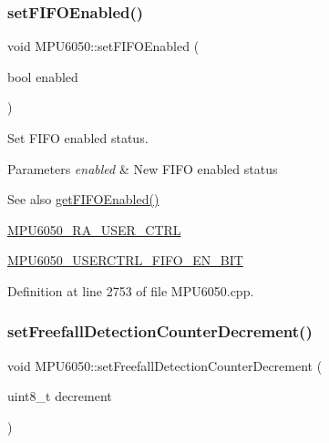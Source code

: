 \subsubsection{\texorpdfstring{setFIFOEnabled()}{setFIFOEnabled()}}
{\footnotesize\ttfamily void M\+P\+U6050\+::set\+F\+I\+F\+O\+Enabled (\begin{DoxyParamCaption}\item[{bool}]{enabled }\end{DoxyParamCaption})}

Set F\+I\+FO enabled status. 
\begin{DoxyParams}{Parameters}
{\em enabled} & New F\+I\+FO enabled status \\
\hline
\end{DoxyParams}
\begin{DoxySeeAlso}{See also}
\mbox{\hyperlink{classMPU6050_ae2687a09ebe0d7fbbf74f560e0dd9a44}{get\+F\+I\+F\+O\+Enabled()}} 

\mbox{\hyperlink{MPU6050_8h_acd4c638a6f677a42ecb9a3d7612d087a}{M\+P\+U6050\+\_\+\+R\+A\+\_\+\+U\+S\+E\+R\+\_\+\+C\+T\+RL}} 

\mbox{\hyperlink{MPU6050_8h_a4d287b028bfb7d4f40a8da106ed74d66}{M\+P\+U6050\+\_\+\+U\+S\+E\+R\+C\+T\+R\+L\+\_\+\+F\+I\+F\+O\+\_\+\+E\+N\+\_\+\+B\+IT}} 
\end{DoxySeeAlso}


Definition at line 2753 of file M\+P\+U6050.\+cpp.


\begin{DoxyCode}{0}

\end{DoxyCode}
\mbox{\label{classMPU6050_a18dd79b7c53600e9ce97eed4bfe6cf15}} 
\subsubsection{\texorpdfstring{setFreefallDetectionCounterDecrement()}{setFreefallDetectionCounterDecrement()}}
{\footnotesize\ttfamily void M\+P\+U6050\+::set\+Freefall\+Detection\+Counter\+Decrement (\begin{DoxyParamCaption}\item[{uint8\+\_\+t}]{decrement }\end{DoxyParamCaption})}

